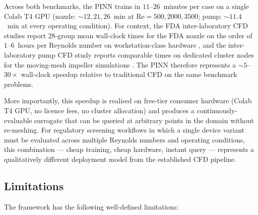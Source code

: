 \documentclass[12pt,a4paper]{article}
\newcommand{\Reyn}{\mathrm{Re}}    %
\begin{document}
Across both benchmarks, the PINN trains in $11$--$26$~minutes
per case on a single Colab T4 GPU
(nozzle: $\sim\!12, 21, 26$~min at $\Reyn = 500, 2000, 3500$;
pump: $\sim\!11.4$~min at every operating condition). For
context, the FDA inter-laboratory CFD studies report 28-group
mean wall-clock times for the FDA nozzle on the order of
$1$--$6$~hours per Reynolds number on workstation-class hardware
\cite{Stewart2012FDA}, and the inter-laboratory pump CFD study
reports comparable times on dedicated cluster nodes for the
moving-mesh impeller simulations \cite{Ponnaluri2023PumpCFD}.
The PINN therefore represents a $\sim 5$--$30\times$ wall-clock
speedup relative to traditional CFD on the same benchmark
problems.

More importantly, this speedup is realised on free-tier consumer
hardware (Colab T4 GPU, no licence fees, no cluster allocation)
and produces a continuously-evaluable surrogate that can be
queried at arbitrary points in the domain without re-meshing.
For regulatory screening workflows in which a single device
variant must be evaluated across multiple Reynolds numbers and
operating conditions, this combination --- cheap training, cheap
hardware, instant query --- represents a qualitatively different
deployment model from the established CFD pipeline.

\subsection{Limitations}
\label{sec:discuss_limits}

The framework has the following well-defined limitations:
\end{document}
